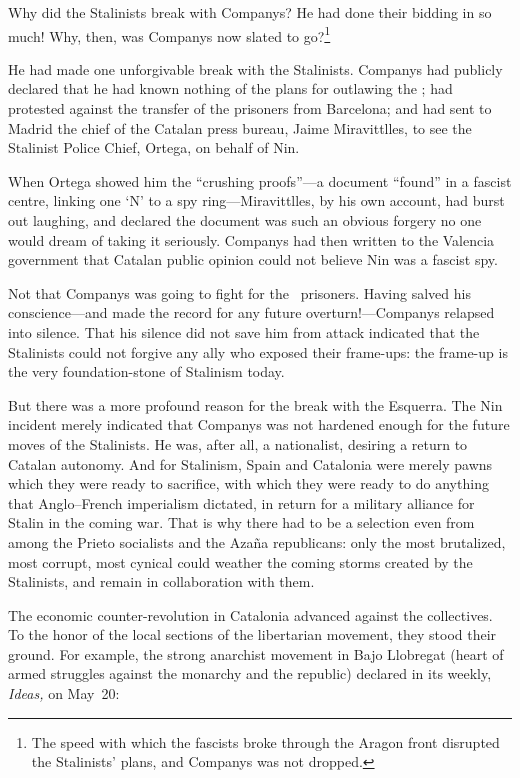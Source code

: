 Why did the Stalinists break with Companys? He had done their bidding in so much! Why, then, was Companys now slated to go?\footnote{The speed with which the fascists broke through the Aragon front disrupted the Stalinists’ plans, and Companys was not dropped.}

He had made one unforgivable break with the Stalinists. Companys had publicly declared that he had known nothing of the plans for outlawing the \POUM; had protested against the transfer of the prisoners from Barcelona; and had sent to Madrid the chief of the Catalan press bureau, Jaime Miravittlles, to see the Stalinist Police Chief, Ortega, on behalf of Nin.

When Ortega showed him the ``crushing proofs''---a document ``found'' in a fascist centre, linking one ‘N’ to a spy ring---Miravittlles, by his own account, had burst out laughing, and declared the document was such an obvious forgery no one would dream of taking it seriously. Companys had then written to the Valencia government that Catalan public opinion could not believe Nin was a fascist spy.

Not that Companys was going to fight for the \POUM\ prisoners. Having salved his conscience---and made the record for any future overturn!---Companys relapsed into silence. That his silence did not save him from attack indicated that the Stalinists could not forgive any ally who exposed their frame-ups: the frame-up is the very foundation-stone of Stalinism today.

But there was a more profound reason for the break with the Esquerra. The Nin incident merely indicated that Companys was not hardened enough for the future moves of the Stalinists. He was, after all, a nationalist, desiring a return to Catalan autonomy. And for Stalinism, Spain and Catalonia were merely pawns which they were ready to sacrifice, with which they were ready to do anything that Anglo--French imperialism dictated, in return for a military alliance for Stalin in the coming war. That is why there had to be a selection even from among the Prieto socialists and the Azaña republicans: only the most brutalized, most corrupt, most cynical could weather the coming storms created by the Stalinists, and remain in collaboration with them.

The economic counter-revolution in Catalonia advanced against the collectives. To the honor of the local sections of the libertarian movement, they stood their ground. For example, the strong anarchist  movement in Bajo Llobregat (heart of armed struggles against the monarchy and the republic) declared in its weekly, \emph{Ideas,} on May~20:

